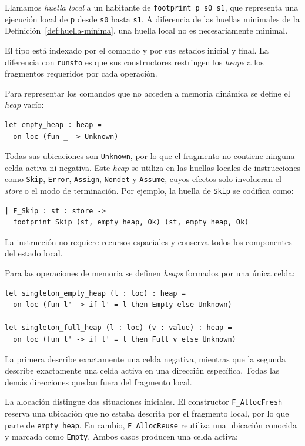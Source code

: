 \documentclass[a4paper,	11pt]{report}
\begin{document}
Llamamos \emph{huella local} a un habitante de \lstinline|footprint p s0 s1|,
que representa una ejecución local de \lstinline|p| desde \lstinline|s0| hasta \lstinline|s1|.
A diferencia de las huellas minimales de la Definición~\ref{def:huella-minima},
una huella local no es necesariamente minimal.

El tipo está indexado por el comando y por sus estados inicial y final.
La diferencia con \lstinline|runsto| es que sus constructores restringen los \emph{heaps} a los fragmentos requeridos por cada operación.

Para representar los comandos que no acceden a memoria dinámica se define el \emph{heap} vacío:

\begin{lstlisting}
let empty_heap : heap =
  on loc (fun _ -> Unknown)
\end{lstlisting}
Todas sus ubicaciones son \lstinline|Unknown|,
por lo que el fragmento no contiene ninguna celda activa ni negativa.
Este \emph{heap} se utiliza en las huellas locales de instrucciones como \lstinline|Skip|,
\lstinline|Error|, \lstinline|Assign|,
\lstinline|Nondet| y \lstinline|Assume|,
cuyos efectos solo involucran el \emph{store} o el modo de terminación.
Por ejemplo,
la huella de \lstinline|Skip| se codifica como:

\begin{lstlisting}
| F_Skip : st : store ->
  footprint Skip (st, empty_heap, Ok) (st, empty_heap, Ok)
\end{lstlisting}
La instrucción no requiere recursos espaciales y conserva todos los componentes del estado local.

Para las operaciones de memoria se definen \emph{heaps} formados por una única celda:

\begin{lstlisting}
let singleton_empty_heap (l : loc) : heap =
  on loc (fun l' -> if l' = l then Empty else Unknown)

let singleton_full_heap (l : loc) (v : value) : heap =
  on loc (fun l' -> if l' = l then Full v else Unknown)
\end{lstlisting}
La primera describe exactamente una celda negativa,
mientras que la segunda describe exactamente una celda activa en una dirección específica.
Todas las demás direcciones quedan fuera del fragmento local.

La alocación distingue dos situaciones iniciales.
El constructor \lstinline|F_AllocFresh| reserva una ubicación que no estaba descrita por el fragmento local,
por lo que parte de \lstinline|empty_heap|.
En cambio,
\lstinline|F_AllocReuse| reutiliza una ubicación conocida y marcada como \lstinline|Empty|.
Ambos casos producen una celda activa:
\end{document}
